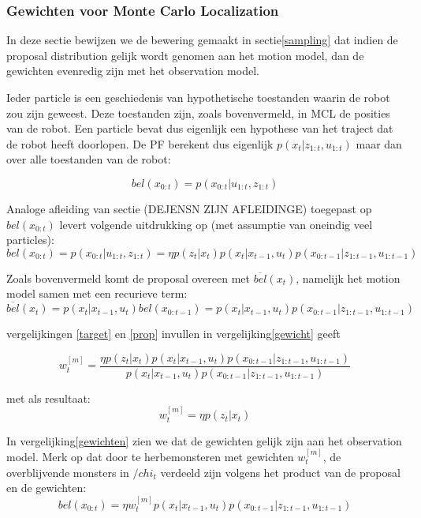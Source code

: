 \documentclass{book}
\begin{document}
\subsubsection{Gewichten voor Monte Carlo Localization}
In deze sectie bewijzen we de bewering gemaakt in sectie\ref{sampling} dat indien de proposal distribution gelijk wordt genomen aan het motion model, dan de gewichten evenredig zijn met het observation model.


Ieder particle is een geschiedenis van hypothetische toestanden waarin de robot zou zijn geweest. Deze toestanden zijn, zoals bovenvermeld, in MCL de posities van de robot. Een particle bevat dus eigenlijk een hypothese van het traject dat de robot heeft doorlopen. De PF berekent dus eigenlijk $p(x_t|z_{1:t},u_{1:t})$ maar dan over alle toestanden van de robot:

\begin{equation}
bel(x_{0:t})= p(x_{0:t}| u_{1:t},z_{1:t})
\end{equation}

Analoge afleiding van sectie (DEJENSN ZIJN AFLEIDINGE) toegepast op $bel(x_{0:t})$ levert volgende uitdrukking op (met assumptie van oneindig veel particles):
\begin{equation}
bel(x_{0:t})= p(x_{0:t}| u_{1:t},z_{1:t}) = \eta p(z_{t}|x_{t}) p(x_{t}|x_{t-1},u_{t}) p(x_{0:t-1}|z_{1:t-1},u_{1:t-1})
\label{target}
\end{equation}

Zoals bovenvermeld komt de proposal overeen met $\overline{bel}(x_{t})$, namelijk het motion model samen met een recurieve term:
\begin{equation}
\overline{bel}(x_{t})=p(x_{t}|x_{t-1},u_{t})bel(x_{0:t-1})=p(x_{t}|x_{t-1},u_{t})p(x_{0:t-1}|z_{1:t-1},u_{1:t-1})
\label{prop}
\end{equation}

vergelijkingen \ref{target} en \ref{prop} invullen in vergelijking\ref{gewicht} geeft

\begin{equation}
w_{t}^{[m]}= \dfrac{\eta p(z_{t}|x_{t}) p(x_{t}|x_{t-1},u_{t}) p(x_{0:t-1}|z_{1:t-1},u_{1:t-1})}{p(x_{t}|x_{t-1},u_{t})p(x_{0:t-1}|z_{1:t-1},u_{1:t-1})}
\end{equation}
 
met als resultaat:
\begin{equation}
w_{t}^{[m]}= \eta p(z_{t}|x_{t})
\label{gewichten}
\end{equation}

In vergelijking\ref{gewichten} zien we dat de gewichten gelijk zijn aan het observation model.
Merk op dat door te herbemonsteren met gewichten $w_{t}^{[m]}$, de overblijvende monsters in $/chi_{t}$ verdeeld zijn volgens het product van de proposal en de gewichten:
\begin{equation}
bel(x_{0:t})= \eta w_{t}^{[m]} p(x_{t}|x_{t-1},u_{t}) p(x_{0:t-1}|z_{1:t-1},u_{1:t-1})
\end{equation}
\end{document}
